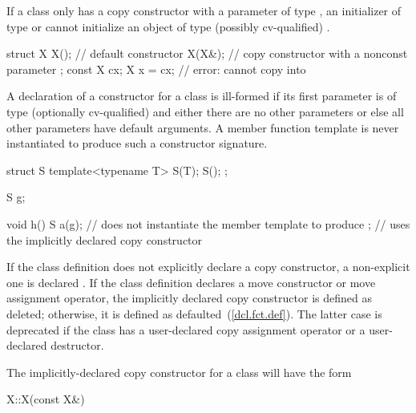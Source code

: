\pnum
\begin{note}
If a class
only has a copy constructor with a parameter of type
,
an initializer of type
or
cannot initialize an object of type
(possibly
cv-qualified)
.
\begin{example}

\begin{codeblock}
struct X {
  X();              // default constructor
  X(X&);            // copy constructor with a nonconst parameter
};
const X cx;
X x = cx;           // error:  cannot copy  into 
\end{codeblock}
\end{example}
\end{note}

\pnum
A declaration of a constructor for a class
is ill-formed if its first parameter is of type (optionally cv-qualified)
and either there are no other parameters or else all other parameters have
default arguments.
A member function template is never instantiated to
produce such a constructor signature.
\begin{example}
\begin{codeblock}
struct S {
  template<typename T> S(T);
  S();
};

S g;

void h() {
  S a(g);           // does not instantiate the member template to produce ;
                    // uses the implicitly declared copy constructor
}
\end{codeblock}
\end{example}

\pnum
{}%
If the class definition does not explicitly declare a copy constructor,
a non-explicit one is declared .
If the class definition declares a move
constructor or move assignment operator, the implicitly declared copy
constructor is defined as deleted; otherwise, it is defined as
defaulted~(\ref{dcl.fct.def}).
The latter case is deprecated if the class has a user-declared copy assignment
operator or a user-declared destructor.

\pnum
The implicitly-declared copy constructor for a class
will have the form

\begin{codeblock}
X::X(const X&)
\end{codeblock}

